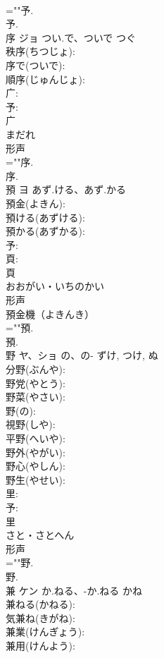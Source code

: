\documentclass[8pt]{extreport}
\begin{document}
\begin{CJK}{UTF8}{min}
\\	=""予.
\\	予.
\\	序	ジョ	つい.で、ついで	つぐ	
\\	秩序(ちつじょ): 
\\	序で(ついで): 
\\	順序(じゅんじょ): 
\\	广: 
\\	予: 
\\	广	
\\	まだれ	
\\	形声 
\\	=""序.
\\	序.
\\	預	ヨ	あず.ける、あず.かる		
\\	預金(よきん): 
\\	預ける(あずける): 
\\	預かる(あずかる): 
\\	予: 
\\	頁: 
\\	頁	
\\	おおがい・いちのかい	
\\	形声 
\\	預金機（よきんき）
\\	=""預.
\\	預.
\\	野	ヤ、ショ	の、の-	ずけ, つけ, ぬ	
\\	分野(ぶんや): 
\\	野党(やとう): 
\\	野菜(やさい): 
\\	野(の): 
\\	視野(しや): 
\\	平野(へいや): 
\\	野外(やがい): 
\\	野心(やしん): 
\\	野生(やせい): 
\\	里: 
\\	予: 
\\	里	
\\	さと・さとへん	
\\	形声 
\\	=""野.
\\	野.
\\	兼	ケン	か.ねる、-か.ねる	かね	
\\	兼ねる(かねる): 
\\	気兼ね(きがね): 
\\	兼業(けんぎょう): 
\\	兼用(けんよう): 

\end{CJK}
\end{document}
